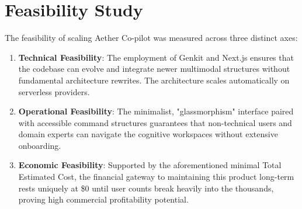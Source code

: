 \section{Feasibility Study}
The feasibility of scaling Aether Co-pilot was measured across three distinct axes:
\begin{enumerate}
    \item \textbf{Technical Feasibility}: The employment of Genkit and Next.js ensures that the codebase can evolve and integrate newer multimodal structures without fundamental architecture rewrites. The architecture scales automatically on serverless providers.
    \item \textbf{Operational Feasibility}: The minimalist, "glassmorphism" interface paired with accessible command structures guarantees that non-technical users and domain experts can navigate the cognitive workspaces without extensive onboarding.
    \item \textbf{Economic Feasibility}: Supported by the aforementioned minimal Total Estimated Cost, the financial gateway to maintaining this product long-term rests uniquely at \$0 until user counts break heavily into the thousands, proving high commercial profitability potential.
\end{enumerate}

\newpage
